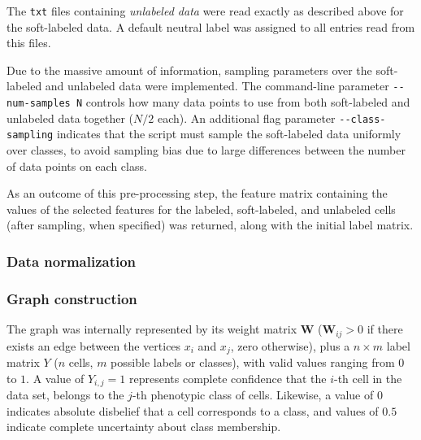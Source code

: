 \documentclass[oneside, a4paper, draft]{memoir} %
\begin{document}
The \texttt{txt} files containing \emph{unlabeled data} were read exactly as described above for the soft-labeled
data. A default neutral label was assigned to all entries read from this files.

Due to the massive amount of information, sampling parameters over the soft-labeled and unlabeled data were
implemented. The command-line parameter \texttt{-{}-num-samples N} controls how many data points to use from both
soft-labeled and unlabeled data together ($N/2$ each). An additional flag parameter \texttt{-{}-class-sampling}
indicates that the script must sample the soft-labeled data uniformly over classes, to avoid sampling bias due to
large differences between the number of data points on each class.

As an outcome of this pre-processing step, the feature matrix containing the values of the selected features
for the labeled, soft-labeled, and unlabeled cells (after sampling, when specified) was returned, along with
the initial label matrix.


\subsubsection{Data normalization}
\lipsum[75]

\subsubsection{Graph construction}
The graph was internally represented by its weight matrix $\mathbf{W}$ ($\mathbf{W}_{ij}>0$ if there exists
an edge between the vertices $x_i$ and $x_j$, zero otherwise), plus a $n \times m$ label matrix $Y$ 
($n$ cells, $m$ possible labels or classes), with valid values ranging from $0$ to $1$. A value
of $Y_{i,j}=1$ represents complete confidence that the $i$-th cell in the data set, belongs to the $j$-th
phenotypic class of cells. Likewise, a value of $0$ indicates absolute disbelief that a cell corresponds to a
class, and values of $0.5$ indicate complete uncertainty about class membership.
\end{document}
